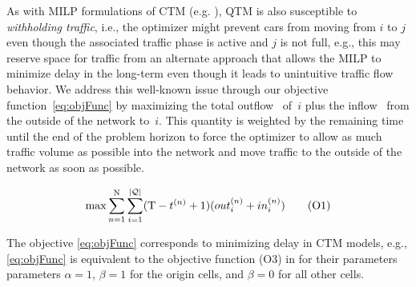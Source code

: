 As with MILP formulations of CTM (e.g. ),
QTM is also susceptible to \emph{withholding traffic}, i.e., the
optimizer might prevent cars from moving from $i$ to $j$ even though the
associated traffic phase is active and $j$ is not full, e.g., this may
reserve space for traffic from an alternate approach that allows the MILP
to minimize delay in the long-term even though it leads to unintuitive traffic
flow behavior.
%
We address this well-known issue through our objective function~\eqref{eq:objFunc} by
maximizing the total outflow~
%
%
of~$i$ plus the inflow~ from the outside of the network to~$i$.
%
This quantity is weighted by the remaining time until the end of the problem
horizon \TMAX to force the optimizer to allow as much traffic volume as possible
into the network and move traffic to the outside of the network as soon as
possible.


\begin{equation}
\max 
 \sum_{n=1}^{\mathrm{N}} \sum_{i=1}^{|\mathcal{\mathcal{Q}}|} (\mathrm{T} - t^{(n)} + 1) (out_{i}^{(n)} + in_{i}^{(n)})
\tag{O1}\label{eq:objFunc}
\end{equation}




The objective \eqref{eq:objFunc} corresponds to minimizing delay in CTM models,
e.g., \eqref{eq:objFunc} is equivalent to the objective function (O3) in
 for their parameters
parameters $\alpha = 1$, $\beta = 1$ for the origin cells, and
$\beta = 0$ for all other cells.

%
%



